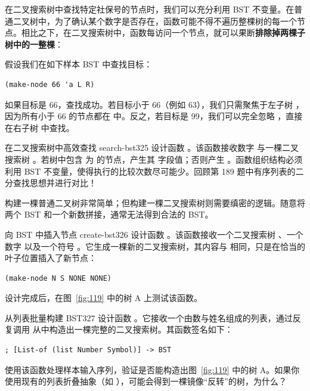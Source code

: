 在二叉搜索树中查找特定社保号的节点时，我们可以充分利用 BST 不变量。在普通二叉树中，为了确认某个数字是否存在，函数可能不得不遍历整棵树的每一个节点。相比之下，在二叉搜索树中，函数每访问一个节点，就可以果断\textbf{排除掉两棵子树中的一整棵}：

假设我们在如下样本 BST 中查找目标：
\begin{lstlisting}[language=BSL]
(make-node 66 'a L R)
\end{lstlisting}
如果目标是 66，查找成功。若目标小于 66（例如 63），我们只需聚焦于左子树 ，因为所有小于 66 的节点都在  中。反之，若目标是 99，我们可以完全忽略 ，直接在右子树  中查找。

\begin{exercise}{在二叉搜索树中高效查找 search-bst}{325}
设计函数 。该函数接收数字  与一棵二叉搜索树 。若树中包含  为  的节点，产生其  字段值；否则产生 。函数组织结构必须利用 BST 不变量，使得执行的比较次数尽可能少。回顾第 189 题中有序列表的二分查找思想并进行对比！
\end{exercise}

构建一棵普通二叉树非常简单；但构建一棵二叉搜索树则需要缜密的逻辑。随意将两个 BST 和一个新数拼接，通常无法得到合法的 BST。

\begin{exercise}{向 BST 中插入节点 create-bst}{326}
设计函数 。该函数接收一个二叉搜索树 、一个数字  以及一个符号 。它生成一棵新的二叉搜索树，其内容与  相同，只是在恰当的  叶子位置插入了新节点：
\begin{lstlisting}[language=BSL]
(make-node N S NONE NONE)
\end{lstlisting}
设计完成后，在图~\ref{fig:119} 中的树 A 上测试该函数。
\end{exercise}

\begin{exercise}{从列表批量构建 BST}{327}
设计函数 。它接收一个由数与姓名组成的列表，通过反复调用  从中构造出一棵完整的二叉搜索树。其函数签名如下：
\begin{lstlisting}[language=BSL]
; [List-of (list Number Symbol)] -> BST
\end{lstlisting}
使用该函数处理样本输入序列，验证是否能构造出图~\ref{fig:119} 中的树 A。如果你使用现有的列表折叠抽象（如 ），可能会得到一棵镜像“反转”的树，为什么？
\end{exercise}

